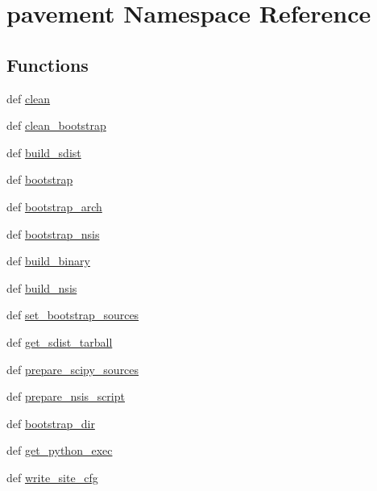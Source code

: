 \hypertarget{namespacepavement}{}\section{pavement Namespace Reference}
\label{namespacepavement}
\subsection*{Functions}
\begin{DoxyCompactItemize}
\item 
def \hyperlink{namespacepavement_a7f09970f52fcdf02591690dbaec5601f}{clean}
\item 
def \hyperlink{namespacepavement_ad0fcbd03869b4bda68d17b49dea1d5cb}{clean\+\_\+bootstrap}
\item 
def \hyperlink{namespacepavement_aeb536fcd71b30fa5934062832471b433}{build\+\_\+sdist}
\item 
def \hyperlink{namespacepavement_afbcd8d032c7a2ae2b08987c26e67a341}{bootstrap}
\item 
def \hyperlink{namespacepavement_a43e7c352c1d62e1e33fccca640cb7176}{bootstrap\+\_\+arch}
\item 
def \hyperlink{namespacepavement_a985988e55348758b55621ae8cd9fa1f3}{bootstrap\+\_\+nsis}
\item 
def \hyperlink{namespacepavement_af8f5f2bb4a6c94791ac0834ac9ac4b50}{build\+\_\+binary}
\item 
def \hyperlink{namespacepavement_a157b0854c3454a713bd5293368985fd8}{build\+\_\+nsis}
\item 
def \hyperlink{namespacepavement_a6d22489739659577f5e6e01a8e8df815}{set\+\_\+bootstrap\+\_\+sources}
\item 
def \hyperlink{namespacepavement_a0e8ab286a8b9ceb98ac210976bbe11ba}{get\+\_\+sdist\+\_\+tarball}
\item 
def \hyperlink{namespacepavement_a8ffa934a12611fd9d1723da0d7929811}{prepare\+\_\+scipy\+\_\+sources}
\item 
def \hyperlink{namespacepavement_a8c80cc9a1b78703482d0a94ebb4417a4}{prepare\+\_\+nsis\+\_\+script}
\item 
def \hyperlink{namespacepavement_a4626e3c599f12e988f0677f9d822e4a7}{bootstrap\+\_\+dir}
\item 
def \hyperlink{namespacepavement_aaefae56e6809dc17bc5b5944074c9076}{get\+\_\+python\+\_\+exec}
\item 
def \hyperlink{namespacepavement_a06d7c79e6f341b0fc374813d7fbacb8d}{write\+\_\+site\+\_\+cfg}
\item 

\end{DoxyCompactItemize}
